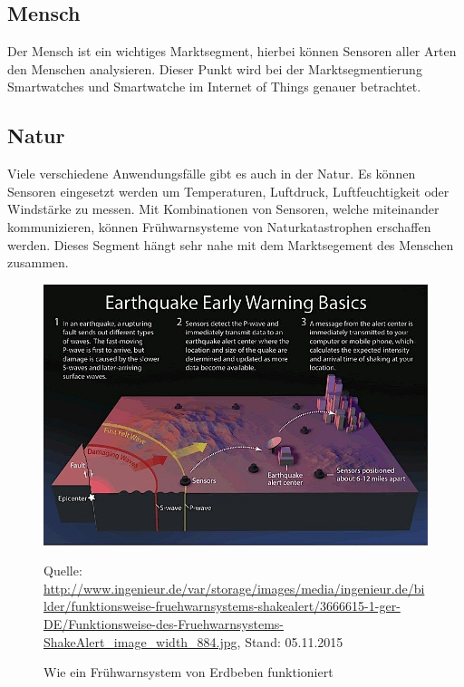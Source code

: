 \subsection{Mensch}
Der Mensch ist ein wichtiges Marktsegment, hierbei können Sensoren aller Arten den Menschen analysieren. Dieser Punkt wird bei der Marktsegmentierung Smartwatches und Smartwatche im Internet of Things genauer betrachtet.

\subsection{Natur}
Viele verschiedene Anwendungsfälle gibt es auch in der Natur. Es können Sensoren eingesetzt werden um Temperaturen, Luftdruck, Luftfeuchtigkeit oder Windstärke zu messen.  Mit Kombinationen von Sensoren, welche miteinander kommunizieren, können Frühwarnsysteme von Naturkatastrophen erschaffen werden. Dieses Segment hängt sehr nahe mit dem Marktsegement des Menschen zusammen.
\begin{figure}[H]
  \centering
  \includegraphics[scale=0.85]{98_Bilder/03_Marktsegmente/erdbeben}
  \caption[Frühwarnsystem von Erdbeben]{Wie ein Frühwarnsystem von Erdbeben funktioniert}
  \footnotesize Quelle: \url{http://www.ingenieur.de/var/storage/images/media/ingenieur.de/bilder/funktionsweise-fruehwarnsystems-shakealert/3666615-1-ger-DE/Funktionsweise-des-Fruehwarnsystems-ShakeAlert_image_width_884.jpg}, Stand: 05.11.2015
\end{figure}
\newpage


